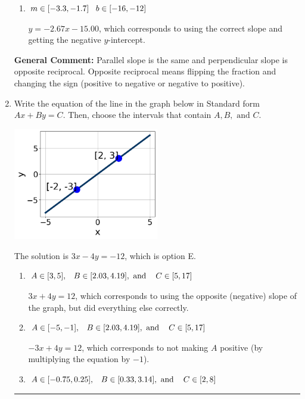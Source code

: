 \documentclass{extbook}[14pt]
\newcommand{\litem}[1]{\item #1

\rule{\textwidth}{0.4pt}}
\begin{document}
\begin{enumerate}
{\begin{enumerate}[label=\Alph*.]
 $y = -0.38x + 15.00$, which corresponds to using the reciprocal slope $(1/m)$.
\item \( m \in [-3.3, -1.7] \hspace*{3mm} b \in [-16, -12] \)

 $y = -2.67x - 15.00$, which corresponds to using the correct slope and getting the negative $y$-intercept.
\end{enumerate}

\textbf{General Comment:} Parallel slope is the same and perpendicular slope is opposite reciprocal. Opposite reciprocal means flipping the fraction and changing the sign (positive to negative or negative to positive).
}
\litem{
Write the equation of the line in the graph below in Standard form $Ax+By=C$. Then, choose the intervals that contain $A, B, \text{ and } C$.

\begin{center}
    \includegraphics[width=0.5\textwidth]{../Figures/linearGraphToStandardCopyB.png}
\end{center}



The solution is \( 3x - 4y = -12 \), which is option E.\begin{enumerate}[label=\Alph*.]
\item \( A \in [3, 5], \hspace{3mm} B \in [2.03, 4.19], \text{ and } \hspace{3mm} C \in [5, 17] \)

 $3x + 4y = 12$, which corresponds to using the opposite (negative) slope of the graph, but did everything else correctly.
\item \( A \in [-5, -1], \hspace{3mm} B \in [2.03, 4.19], \text{ and } \hspace{3mm} C \in [5, 17] \)

 $-3x + 4y = 12$, which corresponds to not making $A$ positive (by multiplying the equation by $-1$).
\item \( A \in [-0.75, 0.25], \hspace{3mm} B \in [0.33, 3.14], \text{ and } \hspace{3mm} C \in [2, 8] \)


\end{enumerate}}
\end{enumerate}
\end{document}
